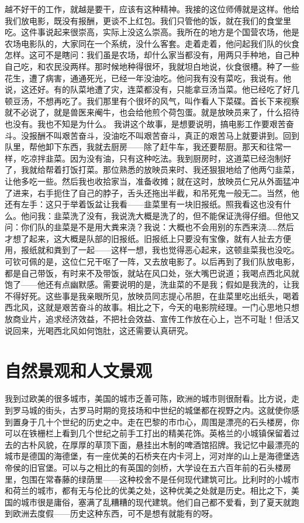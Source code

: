 越不好干的工作，就越是要干，应该有这种精神。我接的这位师傅就是这样。他给我们放电影，既没有报酬，更谈不上红包。我们只管他的饭，就在我们的食堂里吃。这件事说起来很崇高，实际上没这么崇高。我所在的地方是个国营农场，他是农场电影队的，大家同在一个系统，没什么客套。走着走着，他问起我们队的伙食怎样。这可不是瞎问：我们虽是农场，却什么家当都没有，用两只手种地，自己种自己吃，和农民没两样。那时候地种得很坏，我就坦白地说，伙食很槽。种了一些花生，遭了病害，通通死光，已经一年没油吃。他问我有没有菜吃，我说有。他说，这还好。有的队菜地遭了灾，连菜都没有，只能拿豆汤当菜。他已经吃了好几顿豆汤，不想再吃了。我们那里有个很坏的风气，叫作看人下菜碟。首长下来视察就不必说了，就是兽医来阉牛，也会给他煎个荷包蛋。就是放映员来了，什么招待也没有。我也不知是为什么。 我讲这个故事，是想要说明，搞电影工作要艰苦奋斗。没报酬不叫艰苦奋斗，没油吃不叫艰苦奋斗，真正的艰苦马上就要讲到。回到队里，帮他卸下东西，我就去厨房——除了赶牛车，我还要帮厨。那天和往常一样，吃凉拌韭菜。因为没有油，只有这种吃法。我到厨房时，这道菜已经泡制好了，我就给帮着打饭打菜。那位熟悉的放映员来时、我还狠狠地给了他两勺韭菜，让他多吃一些。然后我也收拾家当，准备收摊；就在这时，放映员仁兄从外面猛冲了进来，右手扼住了自己的脖子，舌头还拖出半截，和吊死鬼一般无二。当然，他还有左手：这只于举着饭盆让我看——韭菜里有一块旧报纸。照我看这也没有什么。他问我：韭菜洗了没有，我说洗大概是洗了的，但不能保证洗得仔细。但他又问：你们队的韭菜是不是用大粪来浇？我说：大概也不会用别的东西来浇……然后才想了起来，这大概是队部的旧报纸。旧报纸上只要没有宝像，就有人扯去方便用，报纸就和粪到了一起——这样一想，我也觉得恶心起来，这顿韭菜我也没吃。可钦可佩的是，这位仁兄干呕了一阵，又去放电影了。以后再到了我们队放电影，都是自己带饭，有时来不及带饭，就站在风口处，张大嘴巴说道；我喝点西北风就饱了——他还有点幽默感。需要说明的是，洗韭菜的不是我；假如是我洗的，让我不得好死。这些事是我亲眼所见，放映员同志提心吊胆，在韭菜里吃出纸头，喝着西北风，这就是艰苦奋斗的故事。相比之下，今天的电影院经理。一门心思地只想放商业片，追求经济效益，不把社会效益、宣传工作放在心上，岂不可耻！但活又说回来，光喝西北风如何饱肚，这还需要认真研究。

\chapter{自然景观和人文景观}

我到过欧美的很多城市，美国的城市乏善可陈，欧洲的城市则很耐看。比方说，走到罗马城的街头，古罗马时期的竞技场和中世纪的城堡都在视野之内。这就使你感到置身于几十个世纪的历史之中。走在巴黎的市巾心，周围是漂亮的石头楼房，你可以在铁栅栏上看到几个世纪之前手工打出的精美花饰。英格兰的小城镇保留着过去的古朴风貌，在厚厚的草顶下面，悬挂出木制的啤酒馆招牌。我记忆中最漂亮的城市是德国的海德堡，有一座优美的石桥夹在内卡河上，河对岸的山上是海德堡选帝侯的旧官堡。可以与之相比的有英国的剑桥，大学设在五六百年前的石头楼房里，包围在常春藤的绿荫里——这种校舍不是任何现代建筑可比。比利时的小城市和荷兰的城市，都有无与伦比的优美之处，这种优美之处就是历史。相比之下，美国的城市很是庸俗，塞满了乱糟糟的现代建筑。他们自己都不爱看，到了夏天就跑到欧洲去度假——历史这种东西，可不是想有就能有的呀。 

